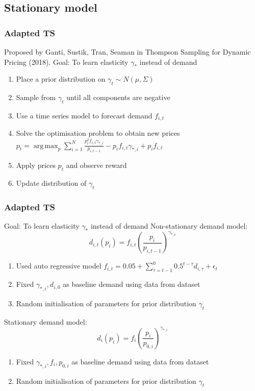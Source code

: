 \documentclass[11pt]{beamer}
\DeclareMathOperator*{\argmax}{arg\,max}
\begin{document}
\subsection{Stationary model}

\begin{frame}
\frametitle{Adapted TS}
Proposed by Ganti, Sustik, Tran, Seaman in Thompson Sampling for Dynamic Pricing (2018).
\newline
\newline
Goal: To learn elasticity $\gamma_*$ instead of demand
\begin{enumerate}
\item Place a prior distribution on $\gamma_t \sim N(\mu, \Sigma)$
\item Sample from $\gamma_t$ until all components are negative
\item Use a time series model to forecast demand $f_{i,t}$ 
\item Solve the optimisation problem to obtain new prices $p_t = \argmax_p  \sum_{i=1}^{N}\frac{p_i^2f_{i,t}\gamma_{*,i}}{p_{i,t-1}} -p_if_{i,t}\gamma_{*,i} + p_if_{i,t}$
\item Apply prices $p_t$ and observe reward
\item Update distribution of $\gamma_t$
\end{enumerate}
\end{frame}

\begin{frame}
\frametitle{Adapted TS}
Goal: To learn elasticity $\gamma_*$ instead of demand
\newline
Non-stationary demand model:
\[d_{i,t}(p_i) = f_{i,t} \left(\frac{p_i}{p_{i,t-1}}\right)^{\gamma_{*,i}} \]
\begin{enumerate}
	\item Used auto regressive model $ f_{i,t} = 0.05 + \sum_{\tau=t-1}^{0} 0.5^{t-\tau}d_{i,\tau} + \epsilon_t $
	\item Fixed $\gamma_{*,i}, d_{i,0}$ as baseline demand using data from dataset
	\item Random initialisation of parameters for prior distribution $\gamma_t$
\end{enumerate}
Stationary demand model:
\[d_i(p_i) = f_i \left(\frac{p_i}{p_{0,i}}\right)^{\gamma_{*,i}} \]
\begin{enumerate}
\item Fixed $\gamma_{*,i}, f_i, p_{0,i}$ as baseline demand using data from dataset
\item Random initialisation of parameters for prior distribution $\gamma_t$
\end{enumerate}
\end{frame}
\end{document}

